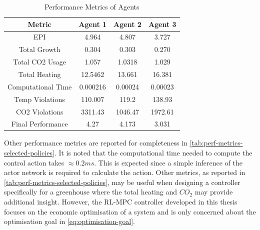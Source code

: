 \begin{table}[H]
	\centering
	\renewcommand{\arraystretch}{1.3} %
	\begin{tabular}{|c|c|c|c|}
		\hline
		\textbf{Metric} & \textbf{Agent 1} & \textbf{Agent 2} & \textbf{Agent 3} \\
		\hline
		EPI                & 4.964      & 4.807     & 3.727 \\
		Total Growth       & 0.304      & 0.303     & 0.270 \\
		Total CO2 Usage    & 1.057      & 1.0318    & 1.029 \\
		Total Heating      & 12.5462    & 13.661    & 16.381 \\
		Computational Time & 0.000216   & 0.00024   & 0.00023 \\
		Temp Violations    & 110.007    & 119.2     & 138.93 \\
		CO2 Violations     & 3311.43    & 1046.47   & 1972.61 \\
		Final Performance  & 4.27       & 4.173     & 3.031 \\ 
		\hline
	\end{tabular}
	\caption{Performance Metrics of Agents}
	\label{tab:perf-metrics-selected-policies}
\end{table}


Other performance metrics are reported for completeness in \autoref{tab:perf-metrics-selected-policies}. It is noted that the computational time needed to compute the control action takes $\approx 0.2ms$. This is expected since a simple inference of the actor network is required to calculate the action. Other metrics, as reported in \autoref{tab:perf-metrics-selected-policies}, may be useful when designing a controller specifically for a greenhouse where the total heating and $CO_2$ may provide additional insight. However, the RL-MPC controller developed in this thesis focuses on the economic optimisation of a system and is only concerned about the optimisation goal in \autoref{eq:optimisation-goal}.

